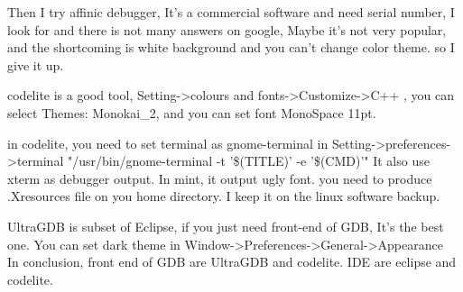 \documentclass[paper=8.5in:11in, twoside, 12pt, pagesize=pdftex]{book}
\begin{document}
Then I try affinic debugger, It's a commercial software and need serial number, I look for and there is not many answers on google, Maybe it's not very popular,  and the shortcoming is white background and you can't change color theme. so I give it up.

codelite is a good tool, Setting->colours and fonts->Customize->C++ , you can select Themes: Monokai\_2, and you can set font MonoSpace 11pt.  

in codelite, you need to set terminal as gnome-terminal in Setting->preferences->terminal "/usr/bin/gnome-terminal -t '\$(TITLE)' -e '\$(CMD)'"
It also use xterm as debugger output. In mint, it output ugly font.  you need to produce .Xresources file on you home directory.  I keep it on the linux software backup. 

UltraGDB is subset of Eclipse, if you just need front-end of GDB, It's the best one. You can set dark theme in Window->Preferences->General->Appearance \\

In conclusion,  front end of GDB are UltraGDB and codelite. IDE are eclipse and codelite.
\end{document}
